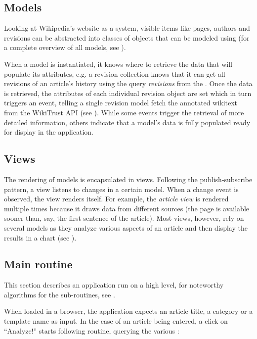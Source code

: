\subsection{Models}

Looking at Wikipedia's website as a system, visible items like pages, authors and revisions can be abstracted into classes of objects that can be modeled using  (for a complete overview of  all models, see ).

When a model is instantiated, it knows where to retrieve the data that will populate its attributes, e.g. a revision collection knows that it can get all revisions of an article's history using the query \emph{revisions} from the  .
Once the data is retrieved, the attributes of each individual revision object are set which in turn triggers an event, telling a single revision model fetch the annotated wikitext from the WikiTrust \ac{API} (see ).
While some events trigger the retrieval of more detailed information, others indicate that a model's data is fully populated ready for display in the application.

\subsection{Views}

The rendering of models is encapsulated in views.
Following the publish-subscribe pattern, a view listens to changes in a certain model.
When a change event is observed, the view renders itself.
For example, the \emph{article view} is rendered multiple times because it draws data from different sources (the page  is available sooner than, say, the first sentence of the article). 
Most views, however, rely on several models as they analyze various aspects of an article and then display the results in a chart (see ).

\subsection{Main routine}

This section describes an application run on a high level, for noteworthy algorithms for the sub-routines, see .

When loaded in a browser, the application expects an article title, a category or a template name as input.
In the case of an article being entered, a click on ``Analyze!'' starts following routine, querying the various :

